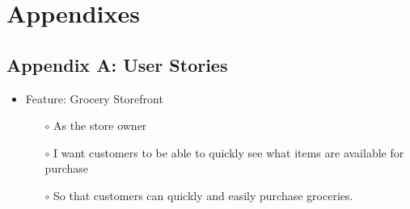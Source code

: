 \documentclass{scrreprt}
\theoremstyle{funreq}
\begin{document}
	
	
	
	
	
	
	
	
	\chapter{Appendixes}
	
	
	\section{Appendix A: User Stories}
	
	
	\begin{itemize}
		\item Feature: Grocery Storefront
		\begin{itemize}
			\item[$\circ$]As the store owner
			\item[$\circ$]I want customers to be able to quickly see  what items are available for purchase
			\item[$\circ$]So that customers can quickly and easily purchase groceries.
		\end{itemize}
	\end{itemize}
	
\end{document}

